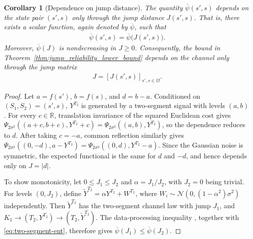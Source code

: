 \documentclass[onecolumn]{IEEEtran}
\newtheorem{corollary}{Corollary}
\theoremstyle{definition}
\begin{document}
\begin{corollary}[Dependence on jump distance]
\label{cor:psi_depends_on_jump_distance}
The quantity $\overline{\psi}(s',s)$ depends on the state pair $(s',s)$ only through the jump distance $J(s',s)$. That is, there exists a scalar function, again denoted by $\overline{\psi}$, such that
\begin{align}
    \overline{\psi}(s',s)=\overline{\psi}\bigl(J(s',s)\bigr).
\end{align}
{
Moreover, $\overline{\psi}(J)$ is nondecreasing in $J\geq0$.
}
Consequently, the bound in Theorem~\ref{thm:jump_reliability_lower_bound} depends on the channel only through the jump matrix
\begin{align}
    J=[J(s',s)]_{s',s\in\Omega}.
\end{align}
\end{corollary}
\begin{proof}
Let \(a=f(s')\), \(b=f(s)\), and \(d=b-a\). Conditioned on
\((S_1,S_2)=(s',s)\), \(Y^{T_2}\) is generated by a two-segment signal
with levels \((a,b)\). For every \(c\in\mathbb{R}\), translation invariance
of the squared Euclidean cost gives
{\(\Psi_{2\sigma^2}((a+c,b+c),Y^{T_2}+c)
=\Psi_{2\sigma^2}((a,b),Y^{T_2})\)}, so the dependence reduces to \(d\).
After taking \(c=-a\), common reflection similarly gives
{\(\Psi_{2\sigma^2}((0,-d),a-Y^{T_2})
=\Psi_{2\sigma^2}((0,d),Y^{T_2}-a)\)}.
Since the Gaussian noise is symmetric, the expected functional is the same
for \(d\) and \(-d\), and hence depends only on \(J=|d|\).

{
To show monotonicity, let \(0\leq J_1\leq J_2\) and
\(\alpha=J_1/J_2\), with \(J_2=0\) being trivial. For levels
\((0,J_2)\), define
\(\widetilde{Y}^{T_2}=\alpha Y^{T_2}+W^{T_2}\), where
\(W_i\sim\mathcal{N}(0,(1-\alpha^2)\sigma^2)\) independently.
Then \(\widetilde{Y}^{T_2}\) has the two-segment channel law with jump
\(J_1\), and
\(K_1\to(T_2,Y^{T_2})\to(T_2,\widetilde{Y}^{T_2})\).
The data-processing inequality \cite{CoverThomas}, together with
\eqref{eq:two-segment-ent}, therefore gives
\(\overline{\psi}(J_1)\leq\overline{\psi}(J_2)\).}
\end{proof}
\end{document}
